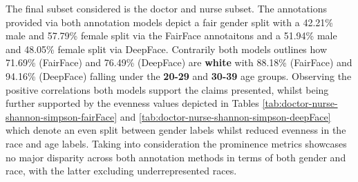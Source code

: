 
The final subset considered is the doctor and nurse subset. The annotations provided via both annotation models depict a fair gender split with a 42.21\% male and 57.79\% female split via the FairFace annotaitons and a 51.94\% male and 48.05\% female split via DeepFace.  Contrarily both models outlines how 71.69\% (FairFace) and 76.49\% (DeepFace) are \textbf{white} with 88.18\% (FairFace) and 94.16\% (DeepFace) falling under the \textbf{20-29} and \textbf{30-39} age groups. Observing the positive correlations both models support the claims presented, whilst being further supported by the evenness values depicted in Tables \ref{tab:doctor-nurse-shannon-simpson-fairFace} and \ref{tab:doctor-nurse-shannon-simpson-deepFace} which denote an even split between gender labels whilst reduced evenness in the race and age labels. Taking into consideration the prominence metrics showcases no major disparity across both annotation methods in terms of both gender and race, with the latter excluding underrepresented races.


